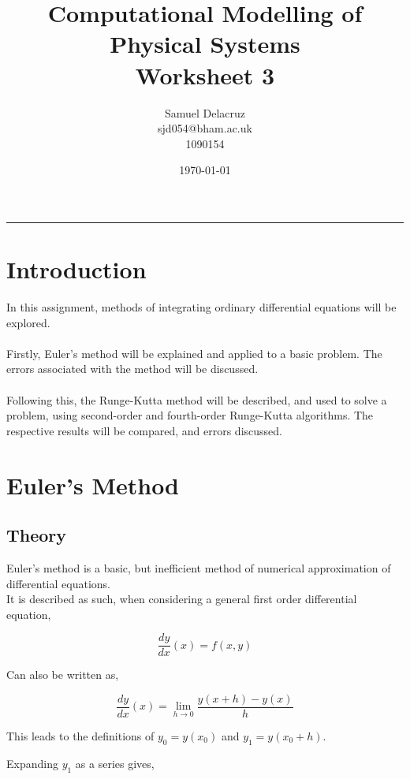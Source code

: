 \documentclass[pdf,color]{UoBnote}
\author{Samuel Delacruz\\
				sjd054@bham.ac.uk\\
				1090154}
\title{Computational Modelling of Physical Systems\\Worksheet 3}
\date{\today}
\begin{document}

\maketitle
\tableofcontents
\listoffigures
\listoftables
\vspace{1cm}\hrule \vspace{1cm}
\newpage

\section{Introduction}
In this assignment, methods of integrating ordinary differential equations will be explored.\\\\
Firstly, Euler's method will be explained and applied to a basic problem. The errors associated with the method will be discussed.\\\\
Following this, the Runge-Kutta method will be described, and used to solve a problem, using second-order and fourth-order Runge-Kutta algorithms. The respective results will be compared, and errors discussed.
\section{Euler's Method}
	\subsection{Theory}
	Euler's method is a basic, but inefficient method of numerical approximation of differential equations.\\
	It is described as such, when considering a general first order differential equation,
	
	\begin{equation}\label{eq:basic_ode}
	\frac{dy}{dx}(x) = f(x,y)
	\end{equation}
	
	Can also be written as,
	
	\begin{equation}
	\frac{dy}{dx}(x) = \lim\limits_{h\rightarrow0}\frac{y(x+h)-y(x)}{h}
	\end{equation}
	
	This leads to the definitions of $y_0 = y(x_0)$ and $y_1 = y(x_0 + h)$.
	
	Expanding $y_1$ as a series gives,
	
\end{document}
